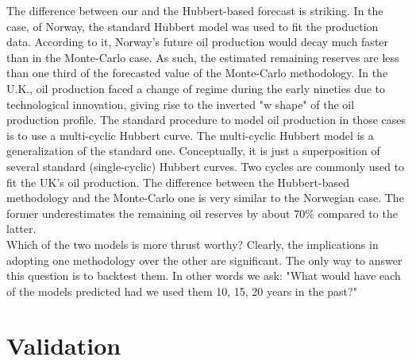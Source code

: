 \documentclass[twoside]{article}
\begin{document}
\begin{multicols}{2}
The difference between our and the Hubbert-based forecast is striking. In the case, of Norway, the standard Hubbert model was used to fit the production data. According to it, Norway's future oil production would decay much faster than in the Monte-Carlo case. As such, the estimated remaining reserves are less than one third of the forecasted value of the Monte-Carlo methodology. In the U.K., oil production faced a change of regime during the early nineties due to technological innovation, giving rise to the inverted "w shape" of the oil production profile. The standard procedure to model oil production in those cases is to use a multi-cyclic Hubbert curve. The multi-cyclic Hubbert model is a generalization of the standard one. Conceptually, it is just a superposition of several standard (single-cyclic) Hubbert curves. Two cycles are commonly used to fit the UK's oil production. The difference between the Hubbert-based methodology and the Monte-Carlo one is very similar to the Norwegian case. The former underestimates the remaining oil reserves by about $70\%$ compared to the latter.\\
Which of the two models is more thrust worthy? Clearly, the implications in adopting one methodology over the other are significant. The only way to answer this question is to backtest them. In other words we ask: "What would have each of the models predicted had we used them 10, 15, 20 years in the past?"




\section{Validation}


\end{multicols}
\end{document}
